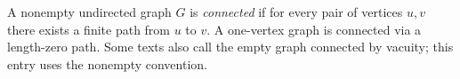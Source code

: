 
A nonempty undirected graph $G$ is \emph{connected} if for every pair of vertices $u,v$ there exists a finite path from $u$ to $v$. A one-vertex graph is connected via a length-zero path. Some texts also call the empty graph connected by vacuity; this entry uses the nonempty convention.
